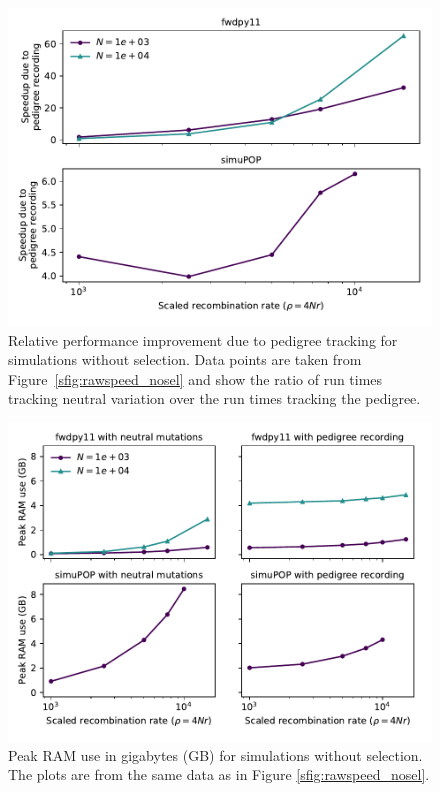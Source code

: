 \documentclass{article}
\begin{document}
\begin{figure}
    \includegraphics[]{sims/speedup_nosel}
    \caption{\label{sfig:speedup_nosel}Relative performance improvement due to pedigree tracking for simulations without
    selection.  Data points are taken from Figure~\ref{sfig:rawspeed_nosel} and show the ratio of run times tracking
neutral variation over the run times tracking the pedigree.}
\end{figure}
\begin{figure}
    \includegraphics[]{sims/memuse_nosel}
    \caption{\label{sfig:ramnosel}Peak RAM use in gigabytes (GB) for simulations without selection.  The plots are from
    the same data as in Figure \ref{sfig:rawspeed_nosel}.}
\end{figure}
\end{document}
